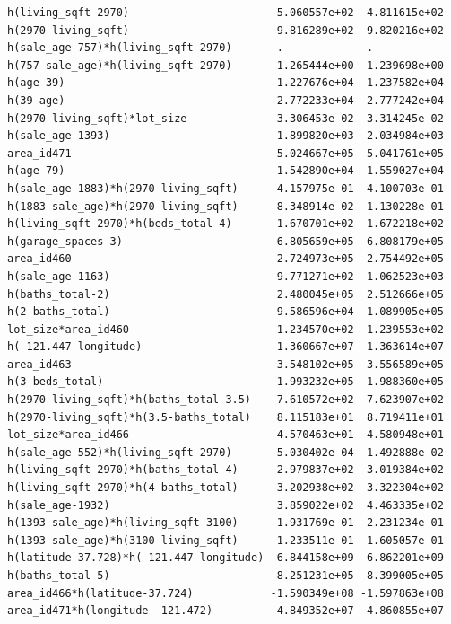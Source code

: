 \documentclass[
]{article}
\begin{document}
\begin{verbatim}
h(living_sqft-2970)                       5.060557e+02  4.811615e+02
h(2970-living_sqft)                      -9.816289e+02 -9.820216e+02
h(sale_age-757)*h(living_sqft-2970)       .             .           
h(757-sale_age)*h(living_sqft-2970)       1.265444e+00  1.239698e+00
h(age-39)                                 1.227676e+04  1.237582e+04
h(39-age)                                 2.772233e+04  2.777242e+04
h(2970-living_sqft)*lot_size              3.306453e-02  3.314245e-02
h(sale_age-1393)                         -1.899820e+03 -2.034984e+03
area_id471                               -5.024667e+05 -5.041761e+05
h(age-79)                                -1.542890e+04 -1.559027e+04
h(sale_age-1883)*h(2970-living_sqft)      4.157975e-01  4.100703e-01
h(1883-sale_age)*h(2970-living_sqft)     -8.348914e-02 -1.130228e-01
h(living_sqft-2970)*h(beds_total-4)      -1.670701e+02 -1.672218e+02
h(garage_spaces-3)                       -6.805659e+05 -6.808179e+05
area_id460                               -2.724973e+05 -2.754492e+05
h(sale_age-1163)                          9.771271e+02  1.062523e+03
h(baths_total-2)                          2.480045e+05  2.512666e+05
h(2-baths_total)                         -9.586596e+04 -1.089905e+05
lot_size*area_id460                       1.234570e+02  1.239553e+02
h(-121.447-longitude)                     1.360667e+07  1.363614e+07
area_id463                                3.548102e+05  3.556589e+05
h(3-beds_total)                          -1.993232e+05 -1.988360e+05
h(2970-living_sqft)*h(baths_total-3.5)   -7.610572e+02 -7.623907e+02
h(2970-living_sqft)*h(3.5-baths_total)    8.115183e+01  8.719411e+01
lot_size*area_id466                       4.570463e+01  4.580948e+01
h(sale_age-552)*h(living_sqft-2970)       5.030402e-04  1.492888e-02
h(living_sqft-2970)*h(baths_total-4)      2.979837e+02  3.019384e+02
h(living_sqft-2970)*h(4-baths_total)      3.202938e+02  3.322304e+02
h(sale_age-1932)                          3.859022e+02  4.463335e+02
h(1393-sale_age)*h(living_sqft-3100)      1.931769e-01  2.231234e-01
h(1393-sale_age)*h(3100-living_sqft)      1.233511e-01  1.605057e-01
h(latitude-37.728)*h(-121.447-longitude) -6.844158e+09 -6.862201e+09
h(baths_total-5)                         -8.251231e+05 -8.399005e+05
area_id466*h(latitude-37.724)            -1.590349e+08 -1.597863e+08
area_id471*h(longitude--121.472)          4.849352e+07  4.860855e+07
                                                                    

\end{verbatim}
\end{document}
